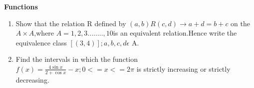 \documentclass[12pt,-letter paper]{article}
\theoremstyle{remark}
\begin{document}
								  \begin{center}
								      \textbf{\fontsize{16}{16}\selectfont Functions}

								      \end{center}

								      \begin{enumerate}
								        \item Show that the relation R defined by $(a,b) R(c,d) \rightarrow a+d=b+c$ on the  $A\times A$,where $A={1,2,3........,10} $is an equivalent relation.Hence write the equivalence class $[(3,4)]; a,b,c,d \epsilon$ A.

									  \item Find the intervals
									   in which the function $f(x)=\frac{4\sin x}{2+ \cos x}-x; 0 <= x <= 2\pi$ is strictly increasing or strictly decreasing.
									   \end{enumerate}

									    
\end{document}
